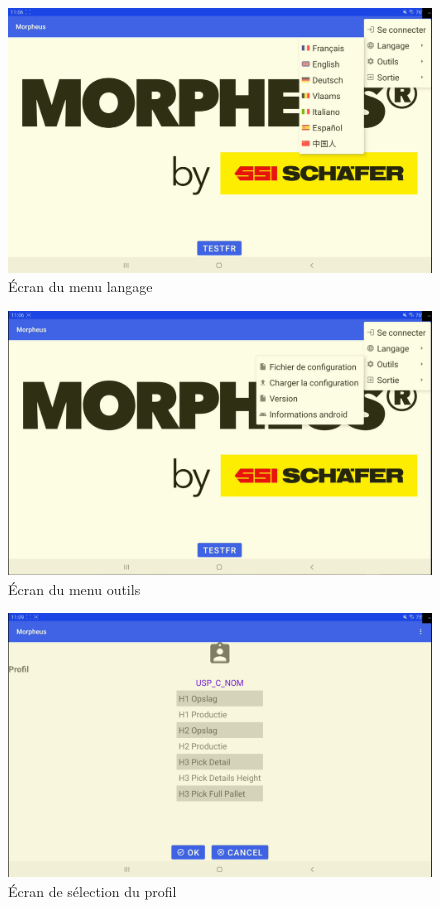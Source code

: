 \documentclass[a4paper, 12pt, french]{article}
\begin{document}
		\newpage

			\begin{figure}[h!]
				\begin{center}
					\includegraphics[width=0.7\linewidth]{application/menu_language.PNG}
				\end{center}
				\caption{Écran du menu langage}
				\label{fig:applications:menu_language}
			\end{figure}	

			\vfill

			\begin{figure}[h!]
				\begin{center}
					\includegraphics[width=0.7\linewidth]{application/menu_tools.PNG}
				\end{center}
				\caption{Écran du menu outils}
				\label{fig:applications:menu_tools}
			\end{figure}	

		\newpage

			\begin{figure}[h!]
				\begin{center}
					\includegraphics[width=0.7\linewidth]{application/profile.PNG}
				\end{center}
				\caption{Écran de sélection du profil}
				\label{fig:applications:profile}
			\end{figure}	
\end{document}
